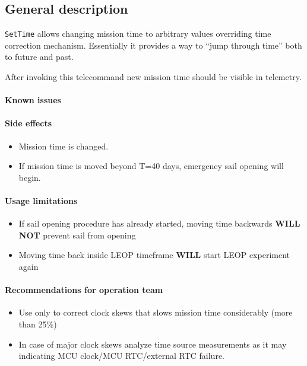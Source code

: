 

\subsection{General description}
\texttt{SetTime} allows changing mission time to arbitrary values overriding time correction mechanism. Essentially it provides a way to ``jump through time'' both to future and past.

After invoking this telecommand new mission time should be visible in telemetry.

\paragraph{Known issues} \mbox{} \None

\paragraph{Side effects}
\begin{itemize}
	\item Mission time is changed.
	\item If mission time is moved beyond T=40 days, emergency sail opening will begin.
\end{itemize}

\paragraph{Usage limitations}
\begin{itemize}
	\item If sail opening procedure has already started, moving time backwards \textbf{WILL NOT} prevent sail from opening
	\item Moving time back inside LEOP timeframe \textbf{WILL} start LEOP experiment again
\end{itemize}

\paragraph{Recommendations for operation team}
\begin{itemize}
	\item Use only to correct clock skews that slows mission time considerably (more than 25\%)
	\item In case of major clock skews analyze time source measurements as it may indicating MCU clock/MCU RTC/external RTC failure.
\end{itemize}


